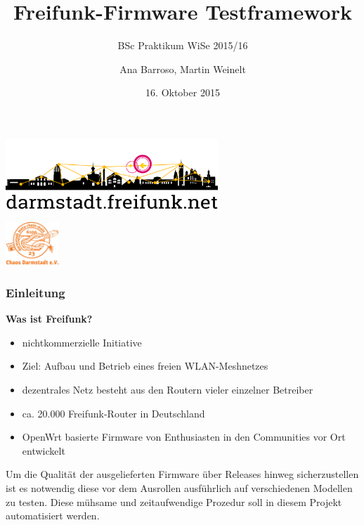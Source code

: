 \documentclass[accentcolor=tud6b,colorbacktitle,inverttitle,landscape,german,presentation,t]{tudbeamer}
\begin{document}
	
	\title[Freifunk-Firmware Testframework]{Freifunk-Firmware Testframework}
	\subtitle{BSc Praktikum WiSe 2015/16}
	
	\author{Ana Barroso, Martin Weinelt}


	\date{16. Oktober 2015}
	
	\begin{titleframe}
		\begin{center}
			\vspace{1cm}
			\includegraphics[width=0.6\textwidth]{images/logo-skyline-text-below}
			\vspace{1.4cm}
		\end{center}
			\flushright
			\includegraphics[width=0.15\textwidth]{images/cda}
	\end{titleframe}
	
	\begin{frame}
		\frametitle{Einleitung}
		\vfill
		\textbf{Was ist Freifunk?}
		\vfill
		\begin{itemize}[<+->]
			\item nichtkommerzielle Initiative
			\item Ziel: Aufbau und Betrieb eines freien WLAN-Meshnetzes
			\item dezentrales Netz besteht aus den Routern vieler einzelner Betreiber
			\item ca. 20.000 Freifunk-Router in Deutschland
			\item OpenWrt basierte Firmware von Enthusiasten in den Communities vor Ort entwickelt
		\end{itemize}
		\vfill
		\pause
		Um die Qualität der ausgelieferten Firmware über Releases hinweg sicherzustellen ist es notwendig diese vor dem Ausrollen ausführlich auf verschiedenen Modellen zu testen. Diese mühsame und zeitaufwendige Prozedur soll in diesem Projekt automatisiert werden.
	\end{frame}
	
\end{document}
